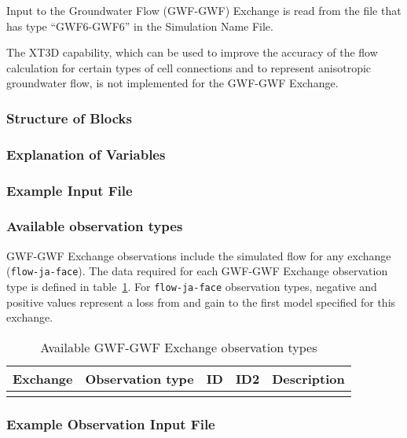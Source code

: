 Input to the Groundwater Flow (GWF-GWF) Exchange is read from the file that has type ``GWF6-GWF6'' in the Simulation Name File.

The XT3D capability, which can be used to improve the accuracy of the flow calculation for certain types of cell connections and to represent anisotropic groundwater flow, is not implemented for the GWF-GWF Exchange.

\vspace{5mm}
\subsubsection{Structure of Blocks}




\vspace{5mm}
\subsubsection{Explanation of Variables}
\begin{description}

\end{description}

\vspace{5mm}
\subsubsection{Example Input File}


\vspace{5mm}
\subsubsection{Available observation types}
GWF-GWF Exchange observations include the simulated flow for any exchange (\texttt{flow-ja-face}). The data required for each GWF-GWF Exchange observation type is defined in table~\ref{table:gwf-gwfobstype}. For \texttt{flow-ja-face} observation types, negative and positive values represent a loss from and gain to the first model specified for this exchange.

\begin{longtable}{p{2cm} p{2.75cm} p{2cm} p{1.25cm} p{7cm}}
\caption{Available GWF-GWF Exchange observation types} \tabularnewline

\hline
\hline
\textbf{Exchange} & \textbf{Observation type} & \textbf{ID} & \textbf{ID2} & \textbf{Description} \\
\hline
\endhead

\hline
\endfoot


\label{table:gwf-gwfobstype}
\end{longtable}


\vspace{5mm}
\subsubsection{Example Observation Input File}


